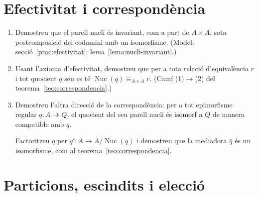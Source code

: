 \section{Efectivitat i correspondència}

\begin{enumerate}[resume]
  \item Demostreu que el parell nucli és invariant, com a part de \(A\times A\), sota postcomposició del codomini amb un isomorfisme. (Model: secció~\ref{prac:efectivitat}; lema~\ref{lema:nucli-invariant}.)

  \item Usant l'axioma d'efectivitat, demostreu que per a tota relació d'equivalència \(r\) i tot quocient \(q\) seu es té \(\operatorname{Nuc}(q)\equiv_{A\times A}r\). (Camí (1)$\to$(2) del teorema~\ref{teo:correspondencia}.)

  \item Demostreu l'altra direcció de la correspondència: per a tot epimorfisme regular \(q\colon A\twoheadrightarrow Q\), el quocient del seu parell nucli és isomorf a \(Q\) de manera compatible amb \(q\). \begin{indicacio}Factoritzeu \(q\) per \(q'\colon A\to A/\operatorname{Nuc}(q)\) i demostreu que la mediadora \(\bar q\) és un isomorfisme, com al teorema~\ref{teo:correspondencia}.\end{indicacio}
\end{enumerate}

\section{Particions, escindits i elecció}

